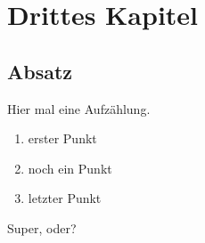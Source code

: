 \chapter{Drittes Kapitel}
\section{Absatz}

Hier mal eine Aufzählung.
\begin{enumerate}
 \item erster Punkt
 \item noch ein Punkt
 \item letzter Punkt
\end{enumerate}

Super, oder?
